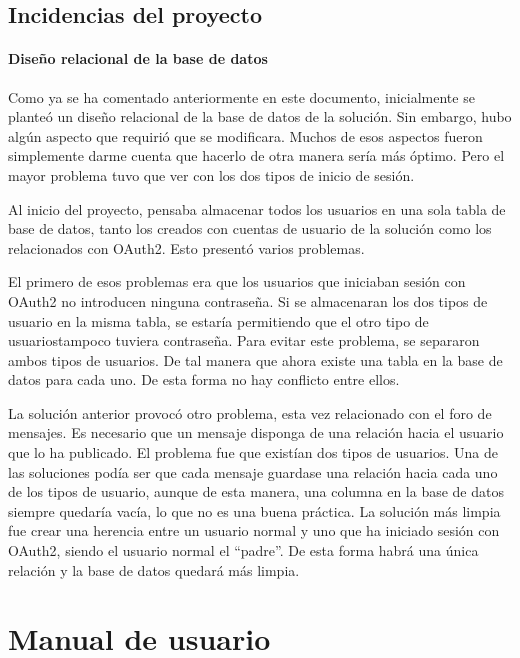 \section{Incidencias del proyecto}

\subsubsection{Diseño relacional de la base de datos}

Como ya se ha comentado anteriormente en este documento, inicialmente se planteó un diseño relacional de la base de datos de la solución. Sin embargo, hubo algún aspecto que requirió que se modificara. Muchos de esos aspectos fueron simplemente darme cuenta que hacerlo de otra manera sería más óptimo. Pero el mayor problema tuvo que ver con los dos tipos de inicio de sesión.

Al inicio del proyecto, pensaba almacenar todos los usuarios en una sola tabla de base de datos, tanto los creados con cuentas de usuario de la solución como los relacionados con OAuth2. Esto presentó varios problemas.

El primero de esos problemas era que los usuarios que iniciaban sesión con OAuth2 no introducen ninguna contraseña. Si se almacenaran los dos tipos de usuario en la misma tabla, se estaría permitiendo que el otro tipo de usuariostampoco tuviera contraseña. Para evitar este problema, se separaron ambos tipos de usuarios. De tal manera que ahora existe una tabla en la base de datos para cada uno. De esta forma no hay conflicto entre ellos.

La solución anterior provocó otro problema, esta vez relacionado con el foro de mensajes. Es necesario que un mensaje disponga de una relación hacia el usuario que lo ha publicado. El problema fue que existían dos tipos de usuarios. Una de las soluciones podía ser que cada mensaje guardase una relación hacia cada uno de los tipos de usuario, aunque de esta manera, una columna en la base de datos siempre quedaría vacía, lo que no es una buena práctica. La solución más limpia fue crear una herencia entre un usuario normal y uno que ha iniciado sesión con OAuth2, siendo el usuario normal el ``padre''. De esta forma habrá una única relación y la base de datos quedará más limpia.

\chapter{Manual de usuario}

